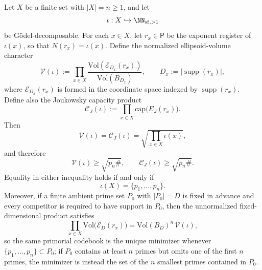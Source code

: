 \begin{theorem}\label{thm:capacity-normalized-primorial-extremality}
Let \(X\) be a finite set with \(|X|=n\ge1\), and let
\[
\iota:X\hookrightarrow \NN_{\mathrm{sf},>1}
\]
be G\"odel-decomposable.  For each \(x\in X\), let \(r_x\in\mathsf P\) be the exponent register of \(\iota(x)\), so that \(N(r_x)=\iota(x)\). Define the normalized ellipsoid-volume character
\[
\mathcal V(\iota):=\prod_{x\in X}\frac{\mathrm{Vol}(\mathcal E_{D_x}(r_x))}{\mathrm{Vol}(B_{D_x})},
\qquad D_x:=|\operatorname{supp}(r_x)|,
\]
where \(\mathcal E_{D_x}(r_x)\) is formed in the coordinate space indexed by \(\operatorname{supp}(r_x)\). Define also the Joukowsky capacity product
\[
\mathcal C_J(\iota):=\prod_{x\in X}\mathrm{cap}\bigl(E_J(r_x)\bigr).
\]
Then
\[
\mathcal V(\iota)=\mathcal C_J(\iota)=\sqrt{\prod_{x\in X}\iota(x)},
\]
and therefore
\[
\mathcal V(\iota)\ge\sqrt{p_n\#},
\qquad
\mathcal C_J(\iota)\ge\sqrt{p_n\#}.
\]
Equality in either inequality holds if and only if
\[
\iota(X)=\{p_1,\dots,p_n\}.
\]
Moreover, if a finite ambient prime set \(P_0\) with \(|P_0|=D\) is fixed in advance and every competitor is required to have support in \(P_0\), then the unnormalized fixed-dimensional product satisfies
\[
\prod_{x\in X}\mathrm{Vol}\bigl(\mathcal E_D(r_x)\bigr)
=\mathrm{Vol}(B_D)^n\,\mathcal V(\iota),
\]
so the same primorial codebook is the unique minimizer whenever \(\{p_1,\dots,p_n\}\subset P_0\); if \(P_0\) contains at least \(n\) primes but omits one of the first \(n\) primes, the minimizer is instead the set of the \(n\) smallest primes contained in \(P_0\).
\end{theorem}

